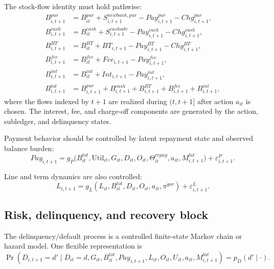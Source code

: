 \documentclass[11pt]{article}
\newcommand{\1}{\mathbf{1}}
\theoremstyle{definition}
\begin{document}
The stock-flow identity must hold pathwise:
\begin{align}
  B_{i,t+1}^{pur}
    &= B_{it}^{pur} + S^{newbank,pur}_{i,t+1} - Pay^{pur}_{i,t+1}
       - Chg^{pur}_{i,t+1},
    \label{eq:balance-pur}\\
  B_{i,t+1}^{cash}
    &= B_{it}^{cash} + S^{cashadv}_{i,t+1} - Pay^{cash}_{i,t+1}
       - Chg^{cash}_{i,t+1},
    \label{eq:balance-cash}\\
  B_{i,t+1}^{BT}
    &= B_{it}^{BT} + BT_{i,t+1} - Pay^{BT}_{i,t+1}
       - Chg^{BT}_{i,t+1},
    \label{eq:balance-bt}\\
  B_{i,t+1}^{fee}
    &= B_{it}^{fee} + Fee_{i,t+1} - Pay^{fee}_{i,t+1},
    \label{eq:balance-fee}\\
  B_{i,t+1}^{int}
    &= B_{it}^{int} + Int_{i,t+1} - Pay^{int}_{i,t+1},
    \label{eq:balance-int}\\
  B_{i,t+1}^{tot}
    &= B_{i,t+1}^{pur}+B_{i,t+1}^{cash}+B_{i,t+1}^{BT}
       +B_{i,t+1}^{fee}+B_{i,t+1}^{int},
    \label{eq:balance-total}
\end{align}
where the flows indexed by $t+1$ are realized during $(t,t+1]$ after action
$a_{it}$ is chosen. The interest, fee, and charge-off components are generated
by the action, subledger, and delinquency states.

Payment behavior should be controlled by latent repayment state and observed
balance burden:
\begin{equation}
  Pay_{i,t+1}
  =
  g_P\bigl(B_{it}^{tot},\mathrm{Util}_{it},G_{it},D_{it},O_{it},\Theta^{repay}_{it},a_{it},M^{lat}_{i,t+1}\bigr)
  + \varepsilon^P_{i,t+1}.
  \label{eq:payment-transition}
\end{equation}

Line and term dynamics are also controlled:
\begin{equation}
  L_{i,t+1}
  =
  g_L(L_{it},B_{it}^{tot},D_{it},O_{it},a_{it},\pi^{gov}) + \varepsilon^L_{i,t+1}.
  \label{eq:line-transition}
\end{equation}

\subsection{Risk, delinquency, and recovery block}

The delinquency/default process is a controlled finite-state Markov chain or
hazard model. One flexible representation is
\begin{equation}
  \Pr(D_{i,t+1}=d'\mid D_{it}=d,G_{it},B_{it}^{tot},Pay_{i,t+1},L_{it},O_{it},U_{it},a_{it},M^{lat}_{i,t+1})
  = p_D(d'\mid \cdot).
  \label{eq:delinquency-transition}
\end{equation}
\end{document}
